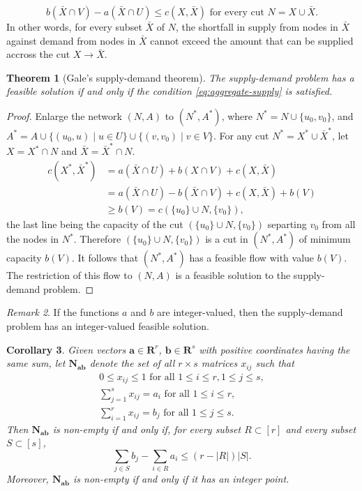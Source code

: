 \documentclass{amsbook}
\newcommand{\bb}{\mathbf b}
\renewcommand{\aa}{\mathbf a}
\newcommand{\RR}{\mathbf R}
\newcommand{\NN}{\mathbf N}
\newtheorem{theorem}{Theorem}[section]
\newtheorem{corollary}[theorem]{Corollary}
\theoremstyle{definition}
\theoremstyle{remark}
\newtheorem{remark}[theorem]{Remark}
\begin{document}
\begin{equation}
  \label{eq:aggregate-supply}
  b(\bar X\cap V) - a(\bar X\cap U) \leq c(X,\bar X) \text{ for every cut } N=X\cup \bar X.
\end{equation}
In other words, for every subset $\bar X$ of $N$, the shortfall in supply from nodes in $\bar X$ against demand from nodes in $\bar X$ cannot exceed the amount that can be supplied accross the cut $X\to \bar X$.
\begin{theorem}
  [Gale's supply-demand theorem]
  \label{theorem:supply-demand}
  The supply-demand problem has a feasible solution if and only if the condition \eqref{eq:aggregate-supply} is satisfied.
\end{theorem}
\begin{proof}
  Enlarge the network $(N,A)$ to $(N^*,A^*)$, where $N^*=N\cup\{u_0,v_0\}$, and $A^*=A\cup\{(u_0,u)\mid u\in U\}\cup \{(v,v_0)\mid v\in V\}$.
  For any cut $N^*=X^*\cup \bar X^*$, let $X=X^*\cap N$ and $\bar X = \bar X^*\cap N$.
  \begin{align*}
    c(X^*,\bar X^*) & = a(\bar X\cap U) + b(X\cap V) + c(X,\bar X)\\
                    & = a(\bar X\cap U) - b(\bar X\cap V) + c(X,\bar X) + b(V)\\
                    & \geq b(V)=c(\{u_0\}\cup N,\{v_0\}), 
  \end{align*}
  the last line being the capacity of the cut $(\{u_0\}\cup N,\{v_0\})$ separting $v_0$ from all the nodes in $N^*$.
  Therefore $(\{u_0\}\cup N,\{v_0\})$ is a cut in $(N^*,A^*)$ of minimum capacity $b(V)$.
  It follows that $(N^*,A^*)$ has a feasible flow with value $b(V)$.
  The restriction of this flow to $(N,A)$ is a feasible solution to the supply-demand problem.
\end{proof}
\begin{remark}
  If the functions $a$ and $b$ are integer-valued, then the supply-demand problem has an integer-valued feasible solution.
\end{remark}
\begin{corollary}
  Given vectors $\aa\in \RR^r$, $\bb\in \RR^s$ with positive coordinates having the same sum, let $\NN_{\aa\bb}$ denote the set of all $r\times s$ matrices $x_{ij}$ such that
  \begin{gather*}
    0\leq x_{ij}\leq 1 \text{ for all }1\leq i\leq r,1\leq j\leq s,\\
    \sum_{j=1}^s x_{ij} =  a_i \text{ for all } 1\leq i\leq r,\\
    \sum_{i=1}^r x_{ij} =  b_j \text{ for all } 1\leq j\leq s.
  \end{gather*}
  Then $\NN_{\aa\bb}$ is non-empty if and only if, for every subset $R\subset [r]$ and every subset $S\subset [s]$,
  \begin{displaymath}
    \sum_{j\in S} b_j - \sum_{i\in R} a_i \leq (r-|R|)|S|.
  \end{displaymath}
  Moreover, $\NN_{\aa\bb}$ is non-empty if and only if it has an integer point.
\end{corollary}
\end{document}
